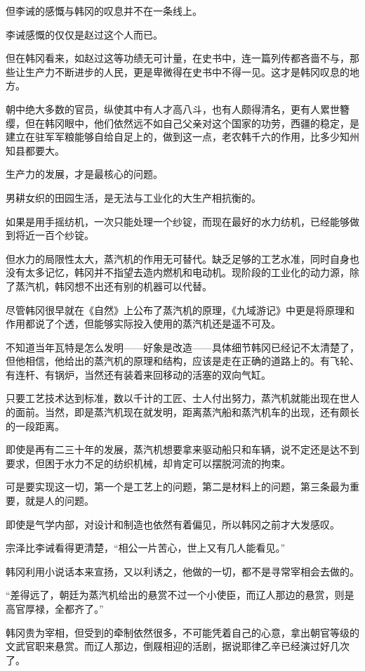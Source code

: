 但李诫的感慨与韩冈的叹息并不在一条线上。

李诫感慨的仅仅是赵过这个人而已。

但在韩冈看来，如赵过这等功绩无可计量，在史书中，连一篇列传都吝啬不与，那些让生产力不断进步的人民，更是卑微得在史书中不得一见。这才是韩冈叹息的地方。

朝中绝大多数的官员，纵使其中有人才高八斗，也有人颇得清名，更有人累世簪缨，但在韩冈眼中，他们依然远不如自己父亲对这个国家的功劳，西疆的稳定，是建立在驻军军粮能够自给自足上的，做到这一点，老农韩千六的作用，比多少知州知县都要大。

生产力的发展，才是最核心的问题。

男耕女织的田园生活，是无法与工业化的大生产相抗衡的。

如果是用手摇纺机，一次只能处理一个纱锭，而现在最好的水力纺机，已经能够做到将近一百个纱锭。

但水力的局限性太大，蒸汽机的作用无可替代。缺乏足够的工艺水准，同时自身也没有太多记忆，韩冈并不指望去造内燃机和电动机。现阶段的工业化的动力源，除了蒸汽机，韩冈想不出还有别的机器可以代替。

尽管韩冈很早就在《自然》上公布了蒸汽机的原理，《九域游记》中更是将原理和作用都说了个透，但能够实际投入使用的蒸汽机还是遥不可及。

不知道当年瓦特是怎么发明——好象是改造——具体细节韩冈已经记不太清楚了，但他相信，他给出的蒸汽机的原理和结构，应该是走在正确的道路上的。有飞轮、有连杆、有锅炉，当然还有装着来回移动的活塞的双向气缸。

只要工艺技术达到标准，数以千计的工匠、士人付出努力，蒸汽机就能出现在世人的面前。当然，即是蒸汽机现在就发明，距离蒸汽船和蒸汽机车的出现，还有颇长的一段距离。

即使是再有二三十年的发展，蒸汽机想要拿来驱动船只和车辆，说不定还是达不到要求，但困于水力不足的纺织机械，却肯定可以摆脱河流的拘束。

可是要实现这一切，第一个是工艺上的问题，第二是材料上的问题，第三条最为重要，就是人的问题。

即使是气学内部，对设计和制造也依然有着偏见，所以韩冈之前才大发感叹。

宗泽比李诫看得更清楚，“相公一片苦心，世上又有几人能看见。”

韩冈利用小说话本来宣扬，又以利诱之，他做的一切，都不是寻常宰相会去做的。

“差得远了，朝廷为蒸汽机给出的悬赏不过一个小使臣，而辽人那边的悬赏，则是高官厚禄，全都齐了。”

韩冈贵为宰相，但受到的牵制依然很多，不可能凭着自己的心意，拿出朝官等级的文武官职来悬赏。而辽人那边，倒屐相迎的活剧，据说耶律乙辛已经演过好几次了。

